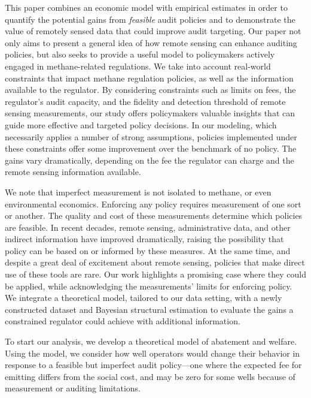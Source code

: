 This paper combines an economic model with empirical estimates in order to quantify the potential gains from \emph{feasible} audit policies and to demonstrate the value of remotely sensed data that could improve audit targeting.
Our paper not only aims to present a general idea of how remote sensing can enhance auditing policies, but also seeks to provide a useful model to policymakers actively engaged in methane-related regulations.
We take into account real-world constraints that impact methane regulation policies, as well as the information available to the regulator.
By considering constraints such as limits on fees, the regulator's audit capacity, and the fidelity and detection threshold of remote sensing measurements, our study offers policymakers valuable insights that can guide more effective and targeted policy decisions.
In our modeling, which necessarily applies a number of strong assumptions,
policies implemented under these constraints offer some improvement over the benchmark of no policy.
The gains vary dramatically, depending on the fee the regulator can charge and the remote sensing information available.


We note that imperfect measurement is not isolated to methane, or even environmental economics.
Enforcing any policy requires measurement of one sort or another.
The quality and cost of these measurements determine which policies are feasible.
In recent decades, remote sensing, administrative data, and other indirect information have improved dramatically, raising the possibility that policy can be based on or informed by these measures.
At the same time, and despite a great deal of excitement about remote sensing, policies that make direct use of these tools are rare.
Our work highlights a promising case where they could be applied, while acknowledging the measurements' limits for enforcing policy.
We integrate a theoretical model, tailored to our data setting, with a newly constructed dataset and Bayesian structural estimation to evaluate the gains a constrained regulator could achieve with additional information.

To start our analysis, we develop a theoretical model of abatement and welfare.
Using the model, we consider how well operators would change their behavior in response to a feasible but imperfect audit policy---one where the expected fee for emitting differs from the social cost,
and may be zero for some wells because of measurement or auditing limitations.

